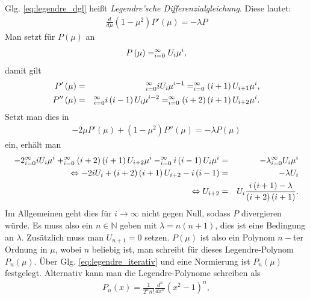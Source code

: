 \documentclass{book}
\let\sum\relax
\DeclareMathOperator*{\sum}{\raisebox{-3.5pt}{\scalebox{2}{\rotatebox{1}{{\bask Σ}}}}}
\begin{document}
Glg. \eqref{eq:legendre_dgl} heißt \textit{Legendre'sche Differenzialgleichung}. Diese lautet:
%
\begin{eqnarray}
\frac{d}{d\mu}\left(1 - \mu^2\right)P'\left(\mu\right) = -\lambda P
\end{eqnarray}
%
Man setzt für $P\left(\mu\right)$ an
%
\begin{eqnarray}
P\left(\mu\right) = \sum_{i = 0}^{\infty}U_i\mu^i, 
\end{eqnarray}
%
damit gilt
%
\begin{eqnarray}
P'\left(\mu\right) & = & \sum_{i = 0}^{\infty}iU_i\mu^{i - 1} = \sum_{i = 0}^{\infty}\left(i + 1\right)U_{i + 1}\mu^i,\\
P''\left(\mu\right) & = & \sum_{i = 0}^{\infty}i\left(i - 1\right)U_i\mu^{i - 2} = \sum_{i = 0}^{\infty}\left(i + 2\right)\left(i + 1\right)U_{i + 2}\mu^i.
\end{eqnarray}
%
Setzt man dies in
%
\begin{eqnarray}
- 2\mu P'\left(\mu\right) + \left(1 - \mu^2\right)P''\left(\mu\right) = -\lambda P\left(\mu\right)
\end{eqnarray}
%
ein, erhält man
%
\begin{eqnarray}
- 2\sum_{i = 0}^{\infty}iU_i\mu^i + \sum_{i = 0}^{\infty}\left(i + 2\right)\left(i + 1\right)U_{i + 2}\mu^i - \sum_{i = 0}^{\infty}i\left(i - 1\right)U_i\mu^i & = & - \lambda\sum_{i = 0}^{\infty}U_i\mu^i\nonumber\\
\Leftrightarrow - 2iU_i+ \left(i + 2\right)\left(i + 1\right)U_{i + 2} - i\left(i - 1\right) & = & -\lambda U_i\nonumber\\
\Leftrightarrow U_{i + 2} & = & U_i\frac{i\left(i + 1\right) - \lambda}{\left(i + 2\right)\left(i + 1\right)}.\label{eq:legendre_iterativ}
\end{eqnarray}
%
Im Allgemeinen geht dies für $i\to\infty$ nicht gegen Null, sodass $P$ divergieren würde. Es muss also ein $n\in\mathbb{N}$ geben mit $\lambda = n\left(n + 1\right)$, dies ist eine Bedingung an $\lambda$. Zusätzlich muss man $U_{n + 1} = 0$ setzen. $P\left(\mu\right)$ ist also ein Polynom $n-$ter Ordnung in $\mu$, wobei $n$ beliebig ist, man schreibt für dieses Legendre-Polynom $P_n\left(\mu\right)$. Über Glg. \eqref{eq:legendre_iterativ} und eine Normierung ist $P_n\left(\mu\right)$ festgelegt. Alternativ kann man die Legendre-Polynome schreiben als
%
\begin{eqnarray}
P_n\left(x\right) = \frac{1}{2^nn!}\frac{d^n}{dx^n}\left(x^2 - 1\right)^n, \label{eq:legendre_poly_formel}
\end{eqnarray}
\end{document}
